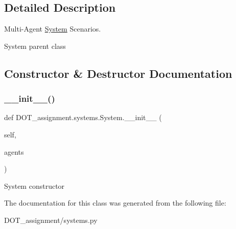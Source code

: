 \subsection{Detailed Description}
Multi-\/\+Agent \mbox{\hyperlink{class_d_o_t__assignment_1_1systems_1_1_system}{System}} Scenarios. 

\begin{DoxyVerb}System parent class
\end{DoxyVerb}
 

\subsection{Constructor \& Destructor Documentation}
\mbox{\label{class_d_o_t__assignment_1_1systems_1_1_system_a7a3d17f1f8331c684a408ddbc6c44ed2}} 
\subsubsection{\texorpdfstring{\_\_init\_\_()}{\_\_init\_\_()}}
{\footnotesize\ttfamily def D\+O\+T\+\_\+assignment.\+systems.\+System.\+\_\+\+\_\+init\+\_\+\+\_\+ (\begin{DoxyParamCaption}\item[{}]{self,  }\item[{}]{agents }\end{DoxyParamCaption})}

\begin{DoxyVerb}System constructor
\end{DoxyVerb}
 

The documentation for this class was generated from the following file\+:\begin{DoxyCompactItemize}
\item 
D\+O\+T\+\_\+assignment/systems.\+py\end{DoxyCompactItemize}
